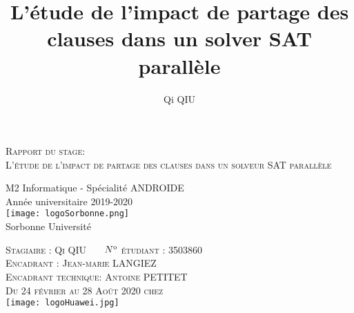 \documentclass{article}
\begin{document}
	\title{L'étude de l'impact de partage des clauses dans un solver SAT parallèle}
	\author{Qi QIU}
	
	
	
    \begin{center}
        \begin{LARGE}
            \vspace{5\baselineskip}
            \textsc{Rapport du stage:}\\
            \textsc{L'étude de l'impact de partage des clauses dans un solveur SAT parallèle}\\
        \end{LARGE}
        
        \vspace{7\baselineskip}
        
        \begin{large}
            \vspace{1\baselineskip}
            \vspace{1\baselineskip}
            M2 Informatique - Spécialité ANDROIDE\\
                        \vspace{1.25\baselineskip}
                        Ann\'ee universitaire 2019-2020\\
            \vspace{\baselineskip}
            \texttt{[image: logoSorbonne.png]} 
            \vspace{\baselineskip}
            \\Sorbonne Universit\'e\\
        \end{large}
        
        	\begin{center}
		\vspace{5\baselineskip}
		\textsc{Stagiaire : Qi QIU \ \ \  $N\textsuperscript{o}$ étudiant : 3503860}\\
		\textsc{Encadrant : Jean-marie LANGIEZ}\\
		\textsc{Encadrant technique: Antoine PETITET}
		\vspace{5\baselineskip}\\
		\textsc{Du 24 février au 28 Août 2020 chez}\\
		\texttt{[image: logoHuawei.jpg]}
	\end{center}
        
    \end{center}
	
\end{document}

